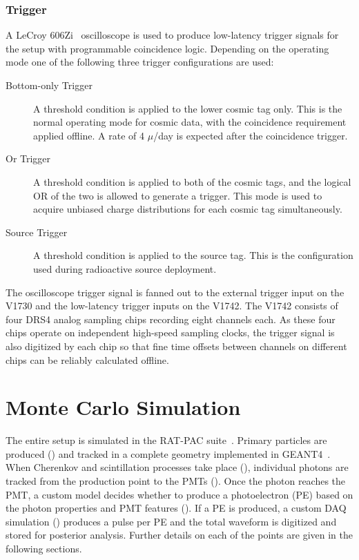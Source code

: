\subsubsection{Trigger}
\label{sec:triggering}

A LeCroy 606Zi~\cite{lecroy606zi} oscilloscope is used to produce low-latency trigger signals for the setup with programmable coincidence logic. 
Depending on the operating mode one of the following three trigger configurations are used:
\begin{description}
\item [Bottom-only Trigger] A threshold condition is applied to the lower cosmic tag only. 
This is the normal operating mode for cosmic data, with the coincidence requirement applied offline.  
A rate of 4 $\mu$/day is expected after the coincidence trigger.
\item [Or Trigger] A threshold condition is applied to both of the cosmic tags, and the logical OR of the two is allowed to generate a trigger. 
This mode is used to acquire unbiased charge distributions for each cosmic tag simultaneously.
\item [Source Trigger] A threshold condition is applied to the source tag. 
This is the configuration used during radioactive source deployment.
\end{description}
The oscilloscope trigger signal is fanned out to the external trigger input on the V1730 and the low-latency trigger inputs on the V1742.
The V1742 consists of four DRS4 analog sampling chips recording eight channels each.
As these four chips operate on independent high-speed sampling clocks, the trigger signal is also digitized by each chip so that fine time offsets between channels on different chips can be reliably calculated offline.  



\section{Monte Carlo Simulation}
\label{sec:simulation}

The entire setup is simulated in the RAT-PAC suite~\cite{ratpac}. Primary particles are produced () and tracked in a complete geometry implemented in GEANT4~\cite{geant4}. When Cherenkov and scintillation processes take place (), individual photons are tracked from the production point to the PMTs (). Once the photon reaches the PMT, a custom model decides whether to produce a photoelectron (PE) based on the photon properties and PMT features (). If a PE is produced, a custom DAQ simulation () produces a pulse per PE and the total waveform is digitized and stored for posterior analysis. Further details on each of the points are given in the following sections.


